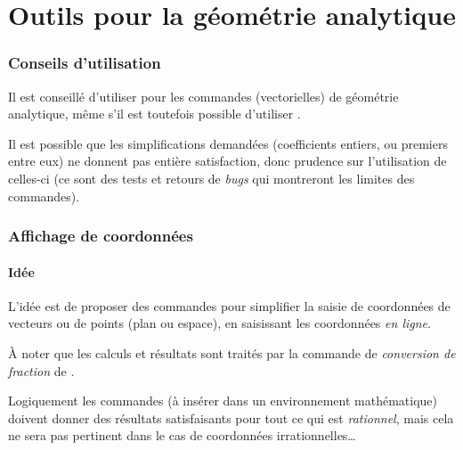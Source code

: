 \documentclass[a4paper,french,11pt]{article}
\newcommand\ctex[1]{\tcbox[vignettelatex]{#1}}
\newcommand\cmaj[1]{%
	{\tcbox[vignetteMaJ]{#1}\xspace}%
}
\begin{document}
\part{Outils pour la géométrie analytique}

\section{Conseils d'utilisation}

\begin{warningblock}
\cmaj{2.6.5} Il est conseillé d'utiliser  pour les commandes (vectorielles) de géométrie analytique, même s'il est toutefois possible d'utiliser .

\smallskip

Il est possible que les simplifications demandées (coefficients entiers, ou premiers entre eux) ne donnent pas entière satisfaction, donc prudence sur l'utilisation de celles-ci (ce sont des tests et retours de \textit{bugs} qui montreront les limites des commandes).
\end{warningblock}

\section{Affichage de coordonnées}\label{affcoord}

\subsection{Idée}

\begin{tipblock}
\cmaj{2.6.4} L'idée est de proposer des commandes pour simplifier la saisie de coordonnées de vecteurs ou de points (plan ou espace), en saisissant les coordonnées \textit{en ligne}.

\smallskip

À noter que les calculs et résultats sont traités par la commande de \textit{conversion de fraction} de \ctex{ProfLycee}.
\end{tipblock}

\begin{warningblock}
Logiquement les commandes (à insérer dans un environnement mathématique) doivent donner des résultats satisfaisants pour tout ce qui est \textit{rationnel}, mais cela ne sera pas pertinent dans le cas de coordonnées irrationnelles\ldots
\end{warningblock}
\end{document}
